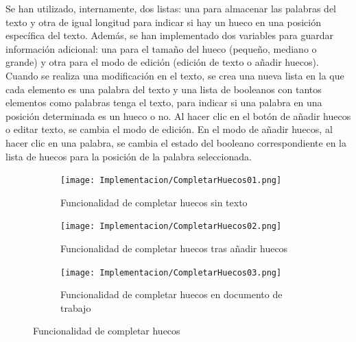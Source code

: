 Se han utilizado, internamente, dos listas: una para almacenar las palabras del texto y otra de igual longitud para indicar si hay un hueco en una posición específica del texto. Además, se han implementado dos variables para guardar información adicional: una para el tamaño del hueco (pequeño, mediano o grande) y otra para el modo de edición (edición de texto o añadir huecos). Cuando se realiza una modificación en el texto, se crea una nueva lista en la que cada elemento es una palabra del texto y una lista de booleanos con tantos elementos como palabras tenga el texto, para indicar si una palabra en una posición determinada es un hueco o no. Al hacer clic en el botón de añadir huecos o editar texto, se cambia el modo de edición. En el modo de añadir huecos, al hacer clic en una palabra, se cambia el estado del booleano correspondiente en la lista de huecos para la posición de la palabra seleccionada.

\begin{figure}[ht!]
  \centering
  \begin{subfigure}{\textwidth}
    \centering
    \texttt{[image: Implementacion/CompletarHuecos01.png]}
    \caption{Funcionalidad de completar huecos sin texto}
    \label{fig:impcompletarhuecos01}
  \end{subfigure}

  \begin{subfigure}{\textwidth}
    \centering
    \texttt{[image: Implementacion/CompletarHuecos02.png]}
    \caption{Funcionalidad de completar huecos tras añadir huecos}
    \label{fig:impcompletarhuecos02}
  \end{subfigure}

  \begin{subfigure}{\textwidth}
    \centering
    \texttt{[image: Implementacion/CompletarHuecos03.png]}
    \caption{Funcionalidad de completar huecos en documento de trabajo}
    \label{fig:impcompletarhuecos03}
  \end{subfigure}

  \caption{Funcionalidad de completar huecos}
  \label{fig:impcompletarhuecos}
\end{figure}

